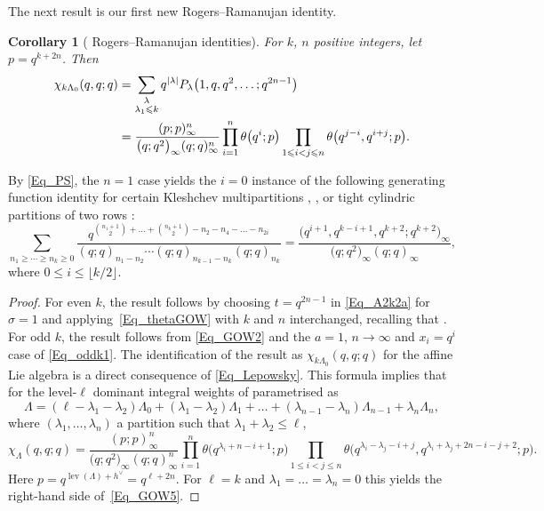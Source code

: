 \documentclass[pdftex]{sigma}
\numberwithin{equation}{section}
\newtheorem{Corollary}[Theorem]{Corollary}
\renewcommand{\leq}{\leqslant}
\renewcommand{\geq}{\geqslant}
\DeclareMathOperator{\lev}{lev}
\newcommand{\floor}[1]{\lfloor#1\rfloor}
\newcommand{\abs}[1]{\vert#1\vert}
\newcommand{\la}{\lambda}
\newcommand{\La}{\Lambda}
\begin{document}
The next result is our first new Rogers--Ramanujan identity.

\begin{Corollary}[ Rogers--Ramanujan identities]
\label{Cor_5}
For $k$, $n$ positive integers, let $p=q^{k+2n}$.
Then
\begin{align}
\chi_{k\La_0}(q,q;q)&=
\sum_{\substack{\la \\[1pt] \la_1\leq k}}
q^{\abs{\la}} P_{\la}\bigl(1,q,q^2,\dots;q^{2n-1}\bigr) \notag \\
&=\frac{(p;p)_{\infty}^n}{\bigl(q;q^2\bigr)_{\infty}(q;q)_{\infty}^n}
\prod_{i=1}^n \theta\bigl(q^i;p\bigr)
\prod_{1\leq i<j\leq n} \theta\bigl(q^{j-i},q^{i+j};p\bigr).
\label{Eq_GOW5}
\end{align}
\end{Corollary}

By \eqref{Eq_PS}, the $n=1$ case yields the $i=0$ instance of
the following generating function identity for certain Kleshchev
multipartitions \cite[Theorem 3]{Andrews10}, \cite[Theorem 3.5]{CSXY22},
\cite[Theorem 1.4]{KY13} or tight cylindric partitions of two rows
\cite[Theorem 13]{KR26}:
\begin{equation}\label{Eq_AKY}
\sum_{n_1\geq\cdots\geq n_k\geq 0}
\frac{q^{\binom{n_1+1}{2}+\dots+\binom{n_k+1}{2}
-n_2-n_4-\dots-n_{2i}}}
{(q;q)_{n_1-n_2}\cdots(q;q)_{n_{k-1}-n_k}(q;q)_{n_k}}
=\frac{\bigl(q^{i+1},q^{k-i+1},q^{k+2};q^{k+2}\bigr)_{\infty}}
{\bigl(q;q^2\bigr)_{\infty}(q;q)_{\infty}},
\end{equation}
where $0\leq i\leq \floor{k/2}$.

\begin{proof}
For even $k$, the result follows by choosing $t=q^{2n-1}$ in
\eqref{Eq_A2k2a} for $\sigma=1$ and applying~\eqref{Eq_thetaGOW} with
$k$ and $n$ interchanged, recalling that
.
For odd $k$, the result follows from \eqref{Eq_GOW2} and the $a=1$,
$n\to\infty$ and $x_i=q^i$ case of \eqref{Eq_oddk1}.
The identification of the result as $\chi_{k\La_0}(q,q;q)$ for
the affine Lie algebra  is a direct
consequence of \eqref{Eq_Lepowsky}.
This formula implies that for the level-$\ell$ dominant integral
weights of  parametrised as
\[
\La=(\ell-\la_1-\la_2)\La_0+(\la_1-\la_2)\La_1+\dots+
(\la_{n-1}-\la_n)\La_{n-1}+\la_n\La_n,
\]
where $(\la_1,\dots,\la_n)$ a partition such that $\la_1+\la_2\leq\ell$,
\[
\chi_{\La}(q,q;q)=\frac{(p;p)_{\infty}^n}{\bigl(q;q^2\bigr)_{\infty}(q;q)_{\infty}^n}
\prod_{i=1}^n \theta\bigl(q^{\la_i+n-i+1};p\bigr)
\prod_{1\leq i<j\leq n}
\theta\bigl(q^{\la_i-\la_j-i+j},q^{\la_i+\la_j+2n-i-j+2};p\bigr).
\]
Here $p=q^{\lev(\La)+h^{\vee}}=q^{\ell+2n}$.
For $\ell=k$ and $\la_1=\dots=\la_n=0$ this yields the right-hand side
of~\eqref{Eq_GOW5}.
\end{proof}
\end{document}
